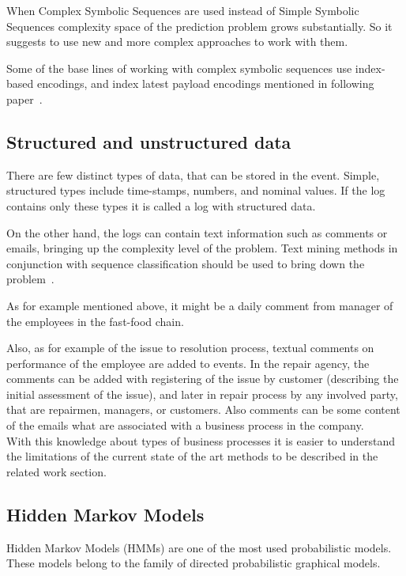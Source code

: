 When Complex Symbolic Sequences are used instead of Simple Symbolic Sequences complexity space of the prediction problem grows substantially. So it suggests to use new and more complex approaches to work with them.

Some of the base lines of working with complex symbolic sequences use index-based encodings, and index latest payload encodings mentioned in following paper~\cite{Leontjeva2015}.   

\subsection{Structured and unstructured data}

There are few distinct types of data, that can be stored in the event. Simple, structured types include time-stamps, numbers, and nominal values. If the log contains only these types it is called a log with structured data. 

On the other hand, the logs can contain text information such as comments or emails, bringing up the complexity level of the problem. Text mining methods in conjunction with sequence classification should be used to bring down the problem~\cite{DBLP:conf/bpm/TeinemaaDMF16}.

As for example mentioned above, it might be a daily comment from manager of the employees in the fast-food chain. 

Also, as for example of the issue to resolution process, textual comments on performance of the employee are added to events. In the repair agency, the comments can be added with registering of the issue by customer (describing the initial assessment of the issue), and later in repair process by any involved party, that are repairmen, managers, or customers. Also comments can be some content of the emails what are associated with a business process in the company. 
\\

With this knowledge about types of business processes it is easier to understand the limitations of the current state of the art methods to be described in the related work section. 


\subsection{Hidden Markov Models}
Hidden Markov Models (HMMs) are one of the most used probabilistic models. These models belong to the family of directed probabilistic graphical models. 

